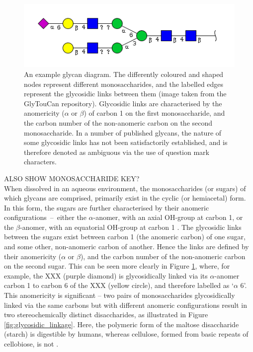 \documentclass[12pt,a4paper]{article}
\begin{document}
\begin{figure}[H]
\centering 
\includegraphics[scale=0.8]{images/glycan_G31576LD.png} 
\caption{An example glycan diagram. The differently coloured and shaped nodes represent different monosaccharides, and the labelled edges represent the glycosidic links between them (image taken from the GlyTouCan repository\protect\footnotemark). Glycosidic links are characterised by the anomericity ($\alpha$ or $\beta$) of carbon 1 on the first monosaccharide, and the carbon number of the non-anomeric carbon on the second monosaccharide. In a number of published glycans, the nature of some glycosidic links has not been satisfactorily established, and is therefore denoted as ambiguous via the use of question mark characters.}
\label{fig:example_glycan}
\end{figure}


ALSO SHOW MONOSACCHARIDE KEY?\\

When dissolved in an aqueous environment, the monosaccharides (or sugars) of which glycans are comprised, primarily exist in the cyclic (or hemiacetal) form. In this form, the sugars are further characterised by their anomeric \mbox{configurations -- either} the $\alpha$-anomer, with an axial OH-group at carbon 1, or the $\beta$-anomer, with an equatorial OH-group at carbon 1 \citep{SONG2012137}. The glycosidic links between the sugars exist between carbon 1 (the anomeric carbon) of one sugar, and some other, non-anomeric carbon of another. Hence the links are defined by their anomericity ($\alpha$ or $\beta$), and the carbon number of the non-anomeric carbon on the second sugar. This can be seen more clearly in Figure \ref{fig:example_glycan}, where, for example, the XXX (purple diamond) is glycosidically linked via its $\alpha$-anomer carbon 1 to carbon 6 of the XXX (yellow circle), and therefore labelled as `$\alpha$ 6'. This anomericity is significant -- two pairs of monosaccharides glycosidically linked via the same carbons but with different anomeric configurations result in two stereochemically distinct disaccharides, as illustrated in Figure \ref{fig:glycosidic_linkage}. Here, the polymeric form of the maltose disaccharide (starch) is digestible by humans, whereas cellulose, formed from basic repeats of cellobiose, is not \citep{SONG2012137}.\\
\end{document}
